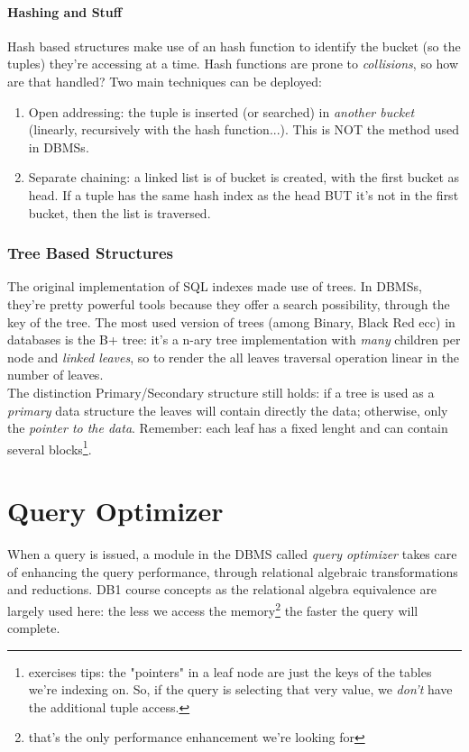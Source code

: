 \documentclass{article}
\begin{document}
					\paragraph{Hashing and Stuff}
						Hash based structures make use of an hash function to identify the bucket (so the tuples) they're accessing at a time. Hash functions are prone to \textit{collisions}, so how are that handled? Two main techniques can be deployed:
						\begin{enumerate}
							\item Open addressing: the tuple is inserted (or searched) in \textit{another bucket} (linearly, recursively with the hash function...). This is NOT the method used in DBMSs.
							\item Separate chaining: a linked list is of bucket is created, with the first bucket as head. If a tuple has the same hash index as the head BUT it's not in the first bucket, then the list is traversed. 
						\end{enumerate}

				\subsubsection{Tree Based Structures}
					The original implementation of SQL indexes made use of trees. In DBMSs, they're pretty powerful tools because they offer a search possibility, through the key of the tree. The most used version of trees (among Binary, Black Red ecc) in databases is the B+ tree: it's a n-ary tree implementation with \textit{many} children per node and \textit{linked leaves}, so to render the all leaves traversal operation linear in the number of leaves.\\
					The distinction Primary/Secondary structure still holds: if a tree is used as a \textit{primary} data structure the leaves will contain directly the data; otherwise, only the \textit{pointer to the data}. Remember: each leaf has a fixed lenght and can contain several blocks\footnote{exercises tips: the "pointers" in a leaf node are just the keys of the tables we're indexing on. So, if the query is selecting that very value, we \textit{don't} have the additional tuple access.}.
	
	\section{Query Optimizer}
		When a query is issued, a module in the DBMS called \textit{query optimizer} takes care of enhancing the query performance, through relational algebraic transformations and reductions. DB1 course concepts as the relational algebra equivalence are largely used here: the less we access the memory\footnote{that's the only performance enhancement we're looking for} the faster the query will complete.
		
\end{document}

